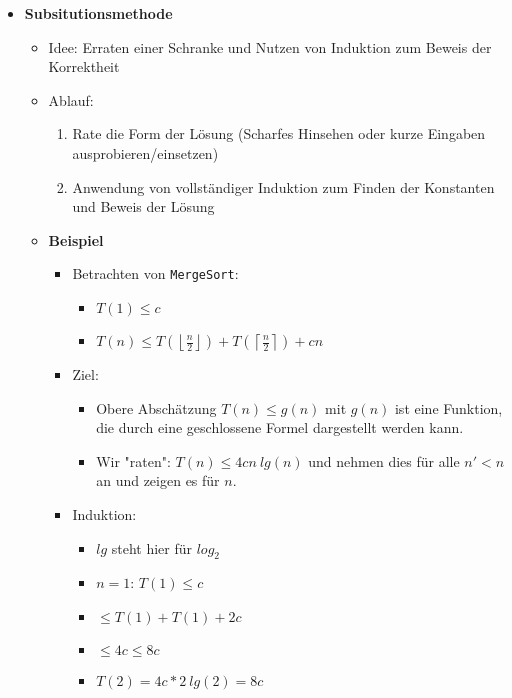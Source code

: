 \begin{itemize}
        \item \textbf{Subsitutionsmethode}
            \begin{itemize}
                \item Idee: Erraten einer Schranke und Nutzen von Induktion zum Beweis der Korrektheit
                \item Ablauf:
                    \begin{enumerate}
                        \item Rate die Form der Lösung (Scharfes Hinsehen oder kurze Eingaben ausprobieren/einsetzen)
                        \item Anwendung von vollständiger Induktion zum Finden der Konstanten und Beweis der Lösung
                    \end{enumerate}
                \item \textbf{Beispiel}
                    \begin{itemize}
                        \item Betrachten von \texttt{MergeSort}:
                            \begin{itemize}
                                \item $T(1) \leq c$
                                \item $T(n) \leq T(\left \lfloor \frac{n}{2} \right \rfloor) + T(\left \lceil \frac{n}{2} \right \rceil) + cn$
                            \end{itemize}

                        \item Ziel:
                            \begin{itemize}
                                \item[]
                                    Obere Abschätzung $T(n) \leq g(n)$ mit $g(n)$ ist eine Funktion, die durch eine 
                                    geschlossene Formel dargestellt werden kann.
                                \item[] 
                                    Wir \string"raten\string": $T(n) \leq 4cn~lg(n)$ und nehmen dies für alle $n' < n$ an und 
                                    zeigen es für $n$. 
                            \end{itemize}

                        \item Induktion:
                            \begin{itemize}
                                \item $lg$ steht hier für $log_2$
                                \item $n = 1$: $T(1) \leq c$
                                \item {}  $\leq T(1) + T(1) +2c$
                                \item[] {\makebox[2cm][l]{}} $\leq 4c \leq 8c$
                                \item[] {\makebox[1cm][l]{}} $T(2) = 4c * 2~lg(2) = 8c$
                            \end{itemize}


\end{itemize}
\end{itemize}
\end{itemize}
